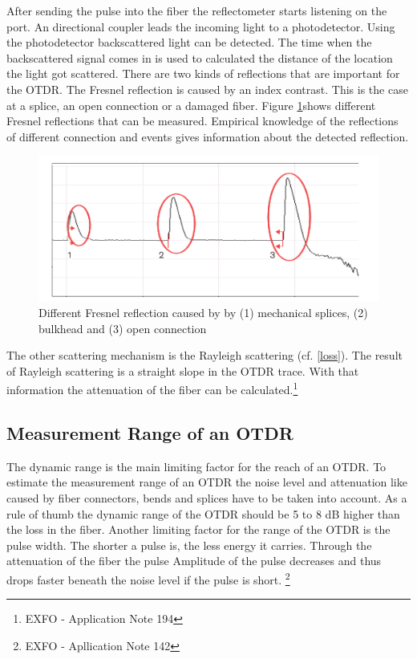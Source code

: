After sending the pulse into the fiber the reflectometer starts listening on the port. An directional coupler leads the incoming light to a photodetector. Using the photodetector backscattered light can be detected. The time when the backscattered signal comes in is used to calculated the distance of the location the light got scattered.
There are two kinds of reflections that are important for the OTDR.
The Fresnel reflection is caused by an index contrast. This is the case at a splice, an open connection or a damaged fiber. Figure \ref{fig:fresnel}\footnotemark[2] shows different Fresnel reflections that can be measured. Empirical knowledge of the reflections of different connection and events gives information about the detected reflection.
 

\begin{figure}%
\centering
\includegraphics[width=.7\columnwidth]{grafiken/fresnel.png}%
\caption{Different Fresnel reflection caused by by (1) mechanical splices, (2) bulkhead and (3) open connection}%
\label{fig:fresnel}%
\end{figure}


The other scattering mechanism is the Rayleigh scattering (cf. \ref{loss}). The result of Rayleigh scattering is a straight slope in the OTDR trace. With that information the attenuation of the fiber can be calculated.\footnote[2]{EXFO - Application Note 194}

\subsection{Measurement Range of an OTDR}
The dynamic range is the main limiting factor for the reach of an OTDR. To estimate the measurement range of an OTDR the noise level and attenuation like caused by fiber connectors, bends and splices have to be taken into account. As a rule of thumb the dynamic range of the OTDR should be 5 to 8 dB higher than the loss in the fiber.
Another limiting factor for the range of the OTDR is the pulse width. The shorter a pulse is, the less energy it carries. Through the attenuation of the fiber the pulse Amplitude of the pulse decreases and thus drops faster beneath the noise level if the pulse is short.
\footnote[3]{EXFO - Apllication Note 142}
